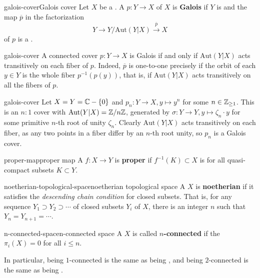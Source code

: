 \begin{topic}{galois-cover}{Galois cover}
    Let $X$ be a . A  $p : Y \to X$ of $X$ is \textbf{Galois} if $Y$ is  and the map $\overline{p}$ in the factorization
    \[ Y \to Y / \text{Aut}(Y|X) \xrightarrow{\overline{p}} X \]
    of $p$ is a .
\end{topic}

\begin{example}{galois-cover}
    A connected cover $p : Y \to X$ is Galois if and only if $\text{Aut}(Y|X)$ acts transitively on each fiber of $p$. Indeed, $\overline{p}$ is one-to-one precisely if the orbit of each $y \in Y$ is the whole fiber $p^{-1}(p(y))$, that is, if $\text{Aut}(Y|X)$ acts transitively on all the fibers of $p$.
\end{example}

\begin{example}{galois-cover}
    Let $X = Y = \mathbb{C} - \{ 0 \}$ and $p_n : Y \to X, y \mapsto y^n$ for some $n \in \mathbb{Z}_{\ge 1}$. This is an $n : 1$ cover with $\text{Aut}(Y|X) = \mathbb{Z}/n\mathbb{Z}$, generated by $\sigma : Y \to Y, y \mapsto \zeta_n \cdot y$ for some primitive $n$-th root of unity $\zeta_n$. Clearly $\text{Aut}(Y|X)$ acts transitively on each fiber, as any two points in a fiber differ by an $n$-th root unity, so $p_n$ is a Galois cover.
\end{example}

\begin{topic}{proper-map}{proper map}
    A  $f : X \to Y$ is \textbf{proper} if $f^{-1}(K) \subset X$ is  for all quasi-compact subsets $K \subset Y$.
\end{topic}

\begin{topic}{noetherian-topological-space}{noetherian topological space}
    A  $X$ is \textbf{noetherian} if it satisfies the \textit{descending chain condition} for closed subsets. That is, for any sequence $Y_1 \supset Y_2 \supset \cdots$ of closed subsets $Y_i$ of $X$, there is an integer $n$ such that $Y_n = Y_{n + 1} = \cdots$.
\end{topic}

\begin{topic}{n-connected-space}{n-connected space}
    A  $X$ is called \textbf{$n$-connected} if the  $\pi_i(X) = 0$ for all $i \le n$.
    
    In particular, being $1$-connected is the same as being , and being $2$-connected is the same as being .
\end{topic}

